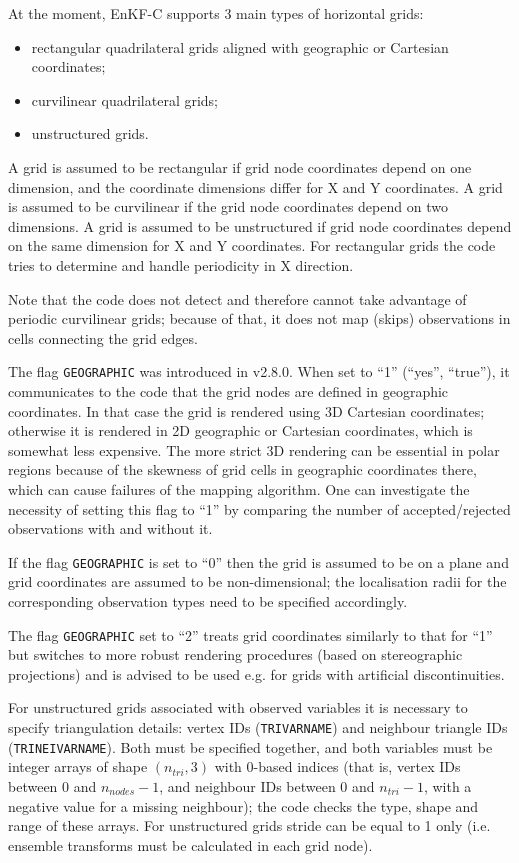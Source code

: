 \documentclass[11pt]{report}
\begin{document}
At the moment, EnKF-C supports 3 main types of horizontal grids:
\begin{itemize}
\item rectangular quadrilateral grids aligned with geographic or Cartesian coordinates;
\item curvilinear quadrilateral grids;
\item unstructured grids.
\end{itemize}
A grid is assumed to be rectangular if grid node coordinates depend on one dimension, and the coordinate dimensions differ for X and Y coordinates.
A grid is assumed to be curvilinear if the grid node coordinates depend on two dimensions.
A grid is assumed to be unstructured if grid node coordinates depend on the same dimension for X and Y coordinates.
For rectangular grids the code tries to determine and handle periodicity in X direction.

Note that the code does not detect and therefore cannot take advantage of periodic curvilinear grids; because of that, it does not map (skips) observations in cells connecting the grid edges.

The flag \verb|GEOGRAPHIC| was introduced in v2.8.0.
When set to ``1'' (``yes'', ``true''), it communicates to the code that the grid nodes are defined in geographic coordinates.
In that case the grid is rendered using 3D Cartesian coordinates; otherwise it is rendered in 2D geographic or Cartesian coordinates, which is somewhat less expensive.
The more strict 3D rendering can be essential in polar regions because of the skewness of grid cells in geographic coordinates there, which can cause failures of the mapping algorithm.
One can investigate the necessity of setting this flag to ``1'' by comparing the number of accepted/rejected observations with and without it.

If the flag \verb|GEOGRAPHIC| is set to ``0'' then the grid is assumed to be on a plane and grid coordinates are assumed to be non-dimensional; the localisation radii for the corresponding observation types need to be specified accordingly.

The flag \verb|GEOGRAPHIC| set to ``2'' treats grid coordinates similarly to that for ``1'' but switches to more robust rendering procedures (based on stereographic projections) and is advised to be used e.g. for grids with artificial discontinuities.

For unstructured grids associated with observed variables it is necessary to specify triangulation details: vertex IDs (\verb|TRIVARNAME|) and neighbour triangle IDs (\verb|TRINEIVARNAME|).
Both must be specified together, and both variables must be integer arrays of shape $(n_{tri}, 3)$ with 0-based indices (that is, vertex IDs between 0 and $n_{nodes} - 1$, and neighbour IDs between 0 and $n_{tri} - 1$, with a negative value for a missing neighbour); the code checks the type, shape and range of these arrays.
For unstructured grids stride can be equal to 1 only (i.e. ensemble transforms must be calculated in each grid node).
\end{document}
